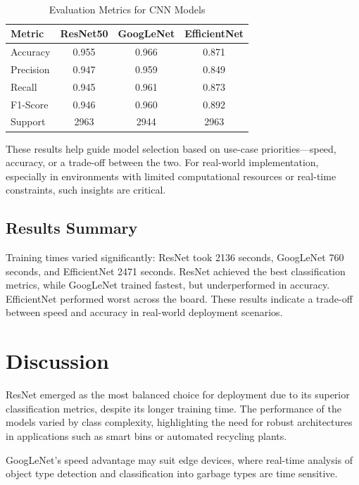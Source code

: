 \documentclass[11pt,twocolumn]{article}
\begin{document}
\begin{table}[h]
\centering
\caption{Evaluation Metrics for CNN Models}
\
\renewcommand{\arraystretch}{1.2} %
\begin{tabular}{|l|c|c|c|}

\hline
\textbf{\scriptsize Metric} & \textbf{\scriptsize ResNet50} & \textbf{\scriptsize GoogLeNet} & \textbf{\scriptsize EfficientNet} \\
\hline
Accuracy        & 0.955 & 0.966 & 0.871 \\
Precision       & 0.947 & 0.959 & 0.849 \\
Recall          & 0.945 & 0.961 & 0.873 \\
F1-Score        & 0.946 & 0.960 & 0.892 \\
Support         & 2963  & 2944  & 2963 \\
\hline
\end{tabular}
\label{tab:evaluation-smallheader}
\end{table}

These results help guide model selection based on use-case priorities—speed, accuracy, or a trade-off between the two. For real-world implementation, especially in environments with limited computational resources or real-time constraints, such insights are critical.

\subsection{Results Summary}
Training times varied significantly: ResNet took 2136 seconds, GoogLeNet 760 seconds, and EfficientNet 2471 seconds. ResNet achieved the best classification metrics, while GoogLeNet trained fastest, but underperformed in accuracy. EfficientNet performed worst across the board. These results indicate a trade-off between speed and accuracy in real-world deployment scenarios.

\section{Discussion}
\label{sec:discussion}
ResNet emerged as the most balanced choice for deployment due to its superior classification metrics, despite its longer training time. The performance of the models varied by class complexity, highlighting the need for robust architectures in applications such as smart bins or automated recycling plants. 

GoogLeNet’s speed advantage may suit edge devices, where real-time analysis of object type detection and classification into garbage types are time sensitive.
\end{document}
